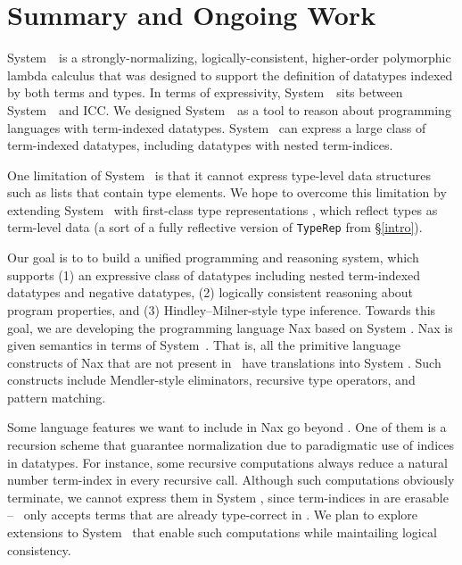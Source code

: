 \section{Summary and Ongoing Work} \label{sec:concl}
System~\Fi\ is a strongly-normalizing, logically-consistent, higher-order
polymorphic lambda calculus that was designed to support the
definition of datatypes indexed by both terms and types.
In terms of expressivity, System~\Fi\ sits between System~\Fw\ and ICC.
We designed System~\Fi\ as a tool to reason about programming
languages with term-indexed datatypes. System \Fi\ can express
a large class of term-indexed datatypes, including datatypes
with nested term-indices.

One limitation of System \Fi\ is that it cannot express type-level
data structures such as lists that contain type elements.
We hope to overcome this limitation by extending System \Fi\ 
with first-class type representations \cite{DagMcb12}, which reflect
types as term-level data (a sort of a fully reflective version of
{\small\tt TypeRep} from \S\ref{intro}).

Our goal is to to build a unified programming and reasoning system,
which supports
(1) an expressive class of datatypes including nested term-indexed datatypes
and negative datatypes,
(2) logically consistent reasoning about program properties, and
(3) Hindley--Milner-style type inference.
Towards this goal, we are developing the programming language
Nax \cite{AhnSheFioPit12} based on System \Fi.
Nax is given semantics in terms of System~\Fi.
That is, all the primitive language constructs of Nax that are not present
in \Fi\ have translations into System \Fi. Such constructs include
Mendler-style eliminators, recursive type operators, and
pattern matching.

Some language features we want to include in Nax go beyond \Fi.
One of them is a recursion scheme that guarantee normalization
due to paradigmatic use of indices in datatypes. For instance,
some recursive computations always reduce a natural number term-index
in every recursive call. Although such computations obviously terminate,
we cannot express them in System \Fi, since term-indices in are erasable
-- \Fi\ only accepts terms that are already type-correct in \Fw.
We plan to explore extensions to System \Fi\ that enable such computations
while maintailing logical consistency.

